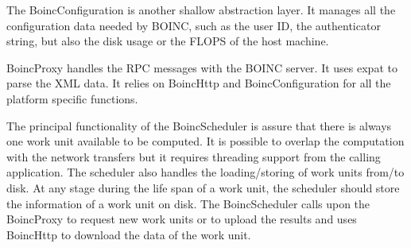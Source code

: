 \documentclass[a4paper,11pt]{article}
\begin{document}
The BoincConfiguration is another shallow abstraction layer. It
manages all the configuration data needed by BOINC, such as the user
ID, the authenticator string, but also the disk usage or the FLOPS of
the host machine.

BoincProxy handles the RPC messages with the BOINC server. It uses
expat to parse the XML data. It relies on BoincHttp and
BoincConfiguration for all the platform specific functions.

The principal functionality of the BoincScheduler is assure that there
is always one work unit available to be computed. It is possible to
overlap the computation with the network transfers but it requires
threading support from the calling application. The scheduler also
handles the loading/storing of work units from/to disk. At any stage
during the life span of a work unit, the scheduler should store the
information of a work unit on disk. The BoincScheduler calls upon the
BoincProxy to request new work units or to upload the results and uses
BoincHttp to download the data of the work unit.

\begin{figure}[h!]
  \label{fig:workunit-scheduling}
  \vspace{10pt}
\end{figure}


\begin{figure}[h!]
  \label{fig:workunit-states}
  \vspace{10pt}
\end{figure}
\end{document}
